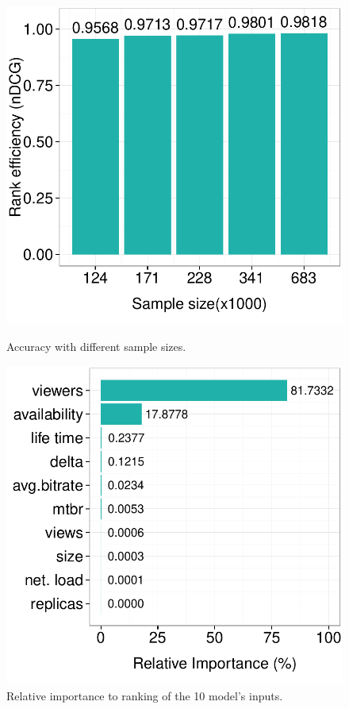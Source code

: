 \begin{figure}[htbp]
	\begin{minipage}[t]{0.48\linewidth}
     \includegraphics[width=.95\textwidth]{inputs/img/sample_size}
		\caption{Accuracy with different sample sizes.}
		\label{fig:sample_size}
	\end{minipage}
	\hspace{0.1cm}
	\begin{minipage}[t]{0.48\linewidth}
		\includegraphics[width=.95\textwidth]{inputs/img/feature_importance}
		\caption{Relative importance to ranking of the 10 model's inputs.}
		\label{fig:feature_importance}
	\end{minipage}
\end{figure}


